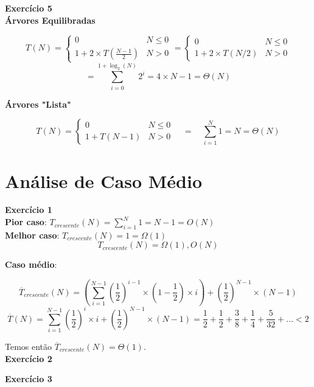 \documentclass[a4paper,11pt]{article}
\begin{document}
	\noindent \textbf{Exercício 5}\\
	
	\noindent \textbf{Árvores Equilibradas}
	
	\[
		T(N) = 
		\begin{cases}
			0 & N \leq 0 \\
			1 + 2 \times T(\frac{N-1}{2}) & N > 0
		\end{cases}
		=
		\begin{cases}
			0 & N \leq 0 \\
			1 + 2 \times T(N/2) & N > 0
		\end{cases}
	\]
	\[
		= \sum_{i=0}^{1 + \log_2(N)} 2^i = 4 \times N - 1 = \Theta(N)
	\]
	
	\noindent \textbf{Árvores "Lista"}
	
	\[
	T(N) = 
	\begin{cases}
		0 & N \leq 0 \\
		1 + T(N - 1) & N > 0
	\end{cases}
	\quad = \quad \sum_{i=1}^{N} 1 = N = \Theta(N)
	\]
	
	
	
	\section{Análise de Caso Médio}
	
	\noindent \textbf{Exercício 1}\\
	
	\noindent \textbf{Pior caso}: $ T_{crescente}(N) = \sum_{i=1}^{N} 1 = N - 1 = O(N) $\\
	
	\noindent \textbf{Melhor caso}: $ T_{crescente}(N) = 1 = \Omega(1) $\\
	\[
		T_{crescente}(N) = \Omega(1), O(N)
	\]
	
	\noindent \textbf{Caso médio}:
	
	\[
		\overline{T}_{crescente}(N) = (\sum_{i=1}^{N-1} (\frac{1}{2})^{i-1} \times (1-\frac{1}{2}) \times i) + (\frac{1}{2})^{N-1} \times (N - 1)
	\]
	\[
		\overline{T}(N) = \sum_{i=1}^{N-1} (\frac{1}{2})^i \times i + (\frac{1}{2})^{N-1} \times (N - 1) = \frac{1}{2} + \frac{1}{2} + \frac{3}{8} + \frac{1}{4} + \frac{5}{32} + ... < 2
	\]
	
	\noindent Temos então $ \overline{T}_{crescente}(N) = \Theta(1) $.\\
	
	\noindent \textbf{Exercício 2}
	
	\noindent \textbf{Exercício 3}
	
\end{document}

